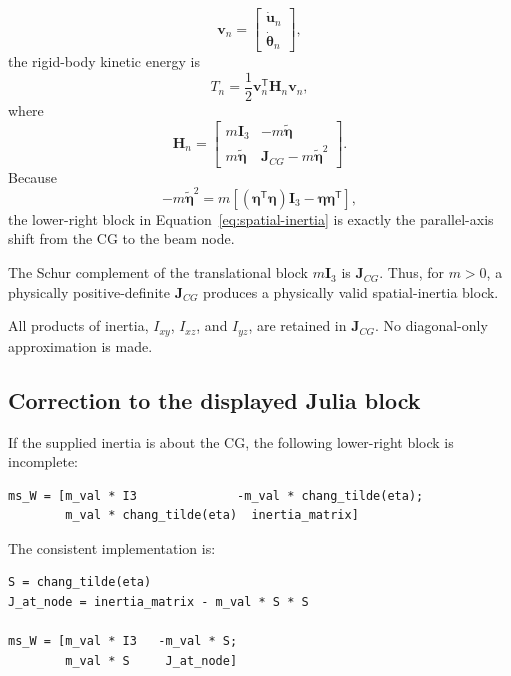 \documentclass[11pt,a4paper]{article}
\newcommand{\mat}[1]{\bm{#1}}
\newcommand{\vect}[1]{\bm{#1}}
\begin{document}
\begin{equation}
\vect v_n =
\begin{bmatrix}
\dot{\vect u}_n\\ \dot{\vect\theta}_n
\end{bmatrix},
\end{equation}
the rigid-body kinetic energy is
\begin{equation}
T_n=\frac{1}{2}\vect v_n^{\mathsf T}\mat H_n\vect v_n,
\end{equation}
where
\begin{equation}
\boxed{
\mat H_n=
\begin{bmatrix}
m\mat I_3 & -m\widetilde{\vect\eta}\\
m\widetilde{\vect\eta} &
\mat J_{CG}-m\widetilde{\vect\eta}^{2}
\end{bmatrix}.}
\label{eq:spatial-inertia}
\end{equation}
Because
\begin{equation}
-m\widetilde{\vect\eta}^{2}
=m\left[(\vect\eta^{\mathsf T}\vect\eta)\mat I_3
-\vect\eta\vect\eta^{\mathsf T}\right],
\end{equation}
the lower-right block in Equation~\eqref{eq:spatial-inertia} is exactly the
parallel-axis shift from the CG to the beam node.

The Schur complement of the translational block \(m\mat I_3\) is
\(\mat J_{CG}\).  Thus, for \(m>0\), a physically positive-definite
\(\mat J_{CG}\) produces a physically valid spatial-inertia block.

All products of inertia, \(I_{xy}\), \(I_{xz}\), and \(I_{yz}\), are retained
in \(\mat J_{CG}\).  No diagonal-only approximation is made.

\subsection{Correction to the displayed Julia block}

If the supplied inertia is about the CG, the following lower-right block is
incomplete:

\begin{lstlisting}
ms_W = [m_val * I3              -m_val * chang_tilde(eta);
        m_val * chang_tilde(eta)  inertia_matrix]
\end{lstlisting}

The consistent implementation is:

\begin{lstlisting}[caption={Nodal spatial inertia when the input inertia is about the CG.}]
S = chang_tilde(eta)
J_at_node = inertia_matrix - m_val * S * S

ms_W = [m_val * I3   -m_val * S;
        m_val * S     J_at_node]
\end{lstlisting}
\end{document}
